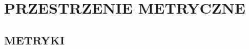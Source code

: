 \documentclass{article}
\begin{document}
\ttfamily
\section*{PRZESTRZENIE METRYCZNE}
\subsection*{METRYKI}
\end{document}
